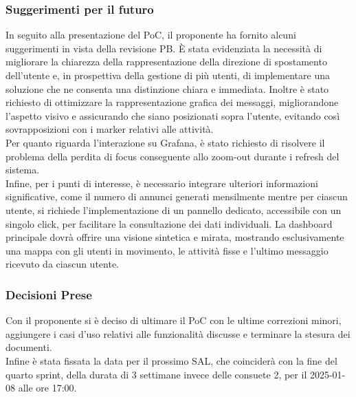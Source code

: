 \documentclass[10pt]{article}
\begin{document}
    \subsubsection{Suggerimenti per il futuro}
    In seguito alla presentazione del PoC, il proponente ha fornito alcuni suggerimenti in vista della revisione PB. È stata evidenziata la necessità di migliorare la chiarezza della rappresentazione della direzione di spostamento dell’utente e, in prospettiva della gestione di più utenti, di implementare una soluzione che ne consenta una distinzione chiara e immediata. Inoltre è stato richiesto di ottimizzare la rappresentazione grafica dei messaggi, migliorandone l’aspetto visivo e assicurando che siano posizionati sopra l’utente, evitando così sovrapposizioni con i marker relativi alle attività.\\
    Per quanto riguarda l’interazione su Grafana, è stato richiesto di risolvere il problema della perdita di focus conseguente allo zoom-out durante i refresh del sistema.\\
    Infine, per i punti di interesse, è necessario integrare ulteriori informazioni significative, come il numero di annunci generati mensilmente mentre per ciascun utente, si richiede l’implementazione di un pannello dedicato, accessibile con un singolo click, per facilitare la consultazione dei dati individuali. La dashboard principale dovrà offrire una visione sintetica e mirata, mostrando esclusivamente una mappa con gli utenti in movimento, le attività fisse e l'ultimo messaggio ricevuto da ciascun utente.
    
    \subsubsection{Decisioni Prese}
    Con il proponente si è deciso di ultimare il PoC con le ultime correzioni minori, aggiungere i casi d'uso relativi alle funzionalità discusse e terminare la stesura dei documenti.\\
    Infine è stata fissata la data per il prossimo SAL, che coinciderà con la fine del quarto sprint, della durata di 3 settimane invece delle consuete 2, per il 2025-01-08 alle ore 17:00.
\end{document}
